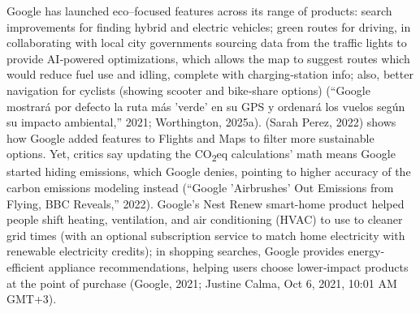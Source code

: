 \documentclass[
  12pt,
  letterpaper,
  DIV=11,
  numbers=noendperiod]{scrartcl}
\begin{document}
Google has launched eco--focused features across its range of products:
search improvements for finding hybrid and electric vehicles; green
routes for driving, in collaborating with local city governments
sourcing data from the traffic lights to provide AI‐powered
optimizations, which allows the map to suggest routes which would reduce
fuel use and idling, complete with charging‐station info; also, better
navigation for cyclists (showing scooter and bike‐share options)
({``{Google mostrar{á} por defecto la ruta m{á}s 'verde' en su GPS y
ordenar{á} los vuelos seg{ú}n su impacto ambiental},''} 2021;
Worthington, 2025a). (Sarah Perez, 2022) shows how Google added features
to Flights and Maps to filter more sustainable options. Yet, critics say
updating the CO\textsubscript{2}eq calculations' math means Google
started hiding emissions, which Google denies, pointing to higher
accuracy of the carbon emissions modeling instead ({``Google
'Airbrushes' Out Emissions from Flying, {BBC} Reveals,''} 2022).
Google's Nest Renew smart-home product helped people shift heating,
ventilation, and air conditioning (HVAC) to use to cleaner grid times
(with an optional subscription service to match home electricity with
renewable electricity credits); in shopping searches, Google provides
energy‐efficient appliance recommendations, helping users choose
lower‐impact products at the point of purchase (Google, 2021; Justine
Calma, Oct 6, 2021, 10:01 AM GMT+3).

\def\pandoctableshortcapt{Examples of CO\textsubscript{2} Visibility in
Google's Products}
\end{document}
